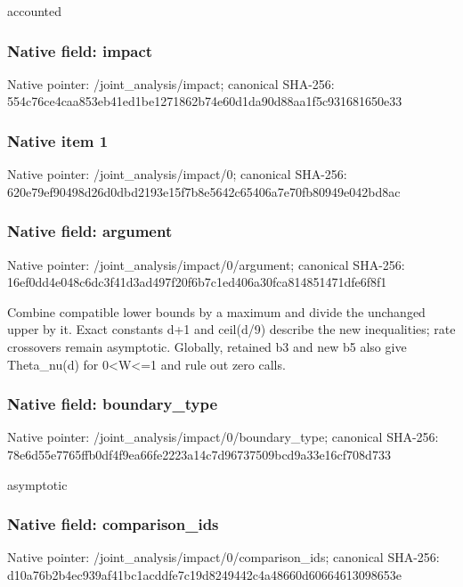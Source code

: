 \documentclass[10pt,a4paper]{article}
\begin{document}
\begingroup\raggedright\sloppy accounted\par\endgroup

\subsubsection{Native field: impact}
Native pointer: /joint\_\allowbreak{}analysis/impact; canonical SHA-256: 554c76ce4caa853eb41ed1be1271862b74e60d1da90d88aa1f5c931681650e33

\subsubsection{Native item 1}
Native pointer: /joint\_\allowbreak{}analysis/impact/0; canonical SHA-256: 620e79ef90498d26d0dbd2193e15f7b8e5642c65406a7e70fb80949e042bd8ac

\subsubsection{Native field: argument}
Native pointer: /joint\_\allowbreak{}analysis/impact/0/argument; canonical SHA-256: 16ef0dd4e048c6dc3f41d3ad497f20f6b7c1ed406a30fca814851471dfe6f8f1

\begingroup\raggedright\sloppy Combine compatible lower bounds by a maximum and divide the unchanged upper by it. Exact constants d+1 and ceil(d/\allowbreak{}9) describe the new inequalities;\allowbreak{} rate crossovers remain asymptotic. Globally,\allowbreak{} retained b3 and new b5 also give Theta\_\allowbreak{}nu(d) for 0<W<=\allowbreak{}1 and rule out zero calls.\par\endgroup

\subsubsection{Native field: boundary\_\allowbreak{}type}
Native pointer: /joint\_\allowbreak{}analysis/impact/0/boundary\_\allowbreak{}type; canonical SHA-256: 78e6d55e7765ffb0df4f9ea66fe2223a14c7d96737509bcd9a33e16cf708d733

\begingroup\raggedright\sloppy asymptotic\par\endgroup

\subsubsection{Native field: comparison\_\allowbreak{}ids}
Native pointer: /joint\_\allowbreak{}analysis/impact/0/comparison\_\allowbreak{}ids; canonical SHA-256: d10a76b2b4ec939af41bc1acddfe7c19d8249442c4a48660d60664613098653e
\end{document}
